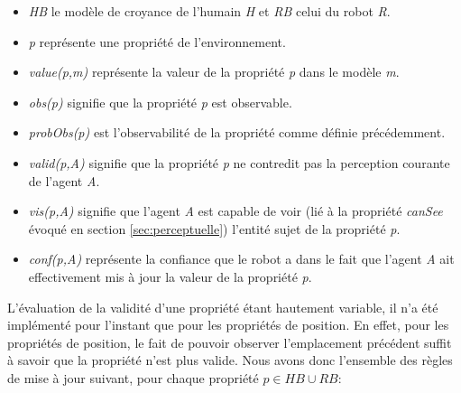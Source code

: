 \documentclass[a4paper,11pt,twoside]{StyleThese}
\begin{document}
\begin{itemize}
\item \textit{HB} le modèle de croyance de l'humain \textit{H} et \textit{RB} celui du robot \textit{R}.
\item \textit{p} représente une propriété de l'environnement.
\item \textit{value(p,m)} représente la valeur de la propriété \textit{p} dans le modèle \textit{m}.
\item \textit{obs(p)} signifie que la propriété \textit{p} est observable.
\item \textit{probObs(p)} est l'observabilité de la propriété comme définie précédemment.
\item \textit{valid(p,A)} signifie que la propriété \textit{p} ne contredit pas la perception courante de l'agent \textit{A}.
\item \textit{vis(p,A)} signifie que l'agent \textit{A} est capable de voir (lié à la propriété \textit{canSee} évoqué en section \ref{sec:perceptuelle}) l'entité sujet de la propriété \textit{p}.
\item \textit{conf(p,A)} représente la confiance que le robot a dans le fait que l'agent \textit{A} ait effectivement mis à jour la valeur de la propriété \textit{p}.
\end{itemize}

L'évaluation de la validité d'une propriété étant hautement variable, il n'a été implémenté pour l'instant que pour les propriétés de position. En effet, pour les propriétés de position, le fait de pouvoir observer l'emplacement précédent suffit à savoir que la propriété n'est plus valide.
Nous avons donc l'ensemble des règles de mise à jour suivant, pour chaque propriété  $p\in HB \cup RB$: 
\end{document}
